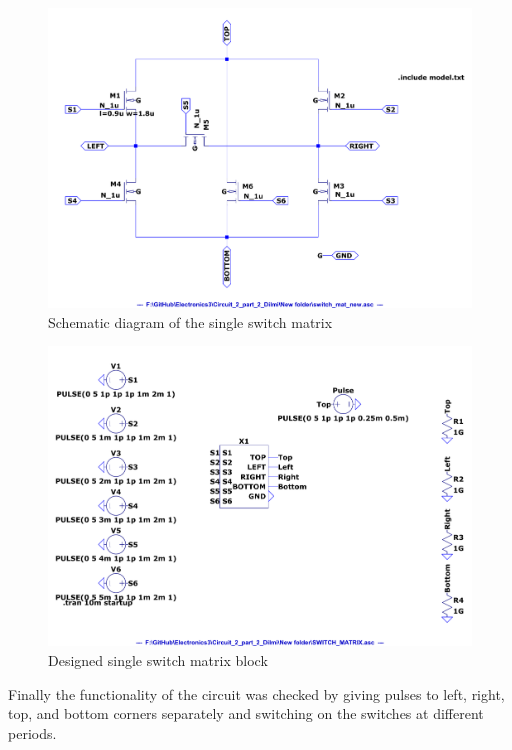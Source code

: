 \documentclass[a4paper,11pt]{article}%
\begin{document}
\begin{figure}[H]
	\centering
	\includegraphics[scale=0.5]{figures/2part2/switch_mat.pdf}
	\caption{Schematic diagram of the single switch matrix}
\end{figure}
\begin{figure}[H]
	\centering
	\includegraphics[scale=0.5]{figures/2part2/block.pdf}
	\caption{Designed single switch matrix block}
\end{figure}

Finally the functionality of the circuit was checked by giving pulses to left, right, top, and bottom corners separately and switching on the switches at different periods.
\end{document}
